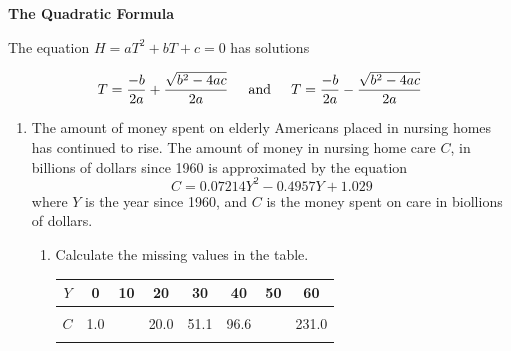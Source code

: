 \documentclass[11pt]{article}
\begin{document}
 \vspace{.2in}
 
 \begin{center}
\textbf{The Quadratic Formula}
\vspace{.1in}

The equation $H=aT^2+bT+c=0$ has solutions 


$$\displaystyle T=\frac{-b}{2a} + \frac{\sqrt{b^2-4ac}}{2a} \hspace{.2in} \text{and} \hspace{.2in}T=\frac{-b}{2a} - \frac{\sqrt{b^2-4ac}}{2a}$$

 \end{center}

\hrulefill

\newpage

\begin{enumerate}

\item The amount of money spent on elderly Americans placed in nursing homes has continued to rise.  The amount of money in nursing home care $C$, in billions of dollars since 1960 is approximated by the equation $$C = 0.07214Y^2-0.4957Y+1.029$$
where $Y$ is the year since 1960, and $C$ is the money spent on care in biollions of dollars.

\begin{enumerate}
\item Calculate the missing values in the table.



\begin{center}
\begin{tabular} {|c ||c |c |c |c |c |c |c |} \hline
$Y$ & \hspace{.25in}0  \hspace{.25in}   &\hspace{.25in} 10\hspace{.25in} & \hspace{.25in} 20   \hspace{.25in} &\hspace{.25in} 30  \hspace{.25in}  & \hspace{.25in} 40   \hspace{.25in}  & \hspace{.25in}50  \hspace{.25in}& \hspace{.25in} 60 \hspace{.25in}  \\ \hline
&&&&&&& \\
$C$ &1.0 &  & 20.0 & 51.1 & 96.6 &   & 231.0  \\ 
&&&&&&& \\ \hline
\end{tabular}
\end{center}



\end{enumerate}
\end{enumerate}
\end{document}

